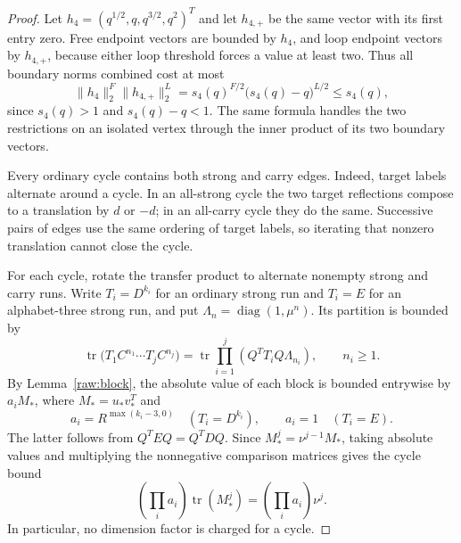 \documentclass[11pt]{amsart}
\theoremstyle{definition}
\theoremstyle{remark}
\numberwithin{equation}{section}
\begin{document}
\begin{proof}
Let $h_4=(q^{1/2},q,q^{3/2},q^2)^T$ and let $h_{4,+}$ be the same
vector with its first entry zero.  Free endpoint vectors are bounded
by $h_4$, and loop endpoint vectors by $h_{4,+}$, because either loop
threshold forces a value at least two.  Thus all boundary norms
combined cost at most
\begin{equation}\label{raw:boundary-budget}
 \|h_4\|_2^F\|h_{4,+}\|_2^L
 =s_4(q)^{F/2}\bigl(s_4(q)-q\bigr)^{L/2}\le s_4(q),
\end{equation}
since $s_4(q)>1$ and $s_4(q)-q<1$.  The same formula handles the two
restrictions on an isolated vertex through the inner product of its
two boundary vectors.

Every ordinary cycle contains both strong and carry edges.  Indeed,
target labels alternate around a cycle.  In an all-strong cycle the
two target reflections compose to a translation by $d$ or $-d$;
in an all-carry cycle they do the same.  Successive pairs of edges
use the same ordering of target labels, so iterating that nonzero
translation cannot close the cycle.

For each cycle, rotate the transfer product to alternate nonempty
strong and carry runs.  Write $T_i=D^{k_i}$ for an ordinary strong
run and $T_i=E$ for an alphabet-three strong run, and put
$\Lambda_n=\operatorname{diag}(1,\mu^n)$.  Its partition is bounded by
\[
 \operatorname{tr}\bigl(T_1C^{n_1}\cdots T_jC^{n_j}\bigr)
 =\operatorname{tr}\prod_{i=1}^j(Q^TT_iQ\Lambda_{n_i}),
 \qquad n_i\ge1.
\]
By Lemma~\ref{raw:block}, the absolute value of each block is bounded
entrywise by $a_iM_*$, where $M_*=u_*v_*^T$ and
\[
 a_i=R^{\max(k_i-3,0)}\quad(T_i=D^{k_i}),\qquad
 a_i=1\quad(T_i=E).
\]
The latter follows from $Q^TEQ=Q^TDQ$.  Since
$M_*^j=\nu^{j-1}M_*$, taking absolute values and multiplying the
nonnegative comparison matrices gives the cycle bound
\[
 \left(\prod_i a_i\right)\operatorname{tr}(M_*^j)
 =\left(\prod_i a_i\right)\nu^j.
\]
In particular, no dimension factor is charged for a cycle.


\end{proof}
\end{document}
